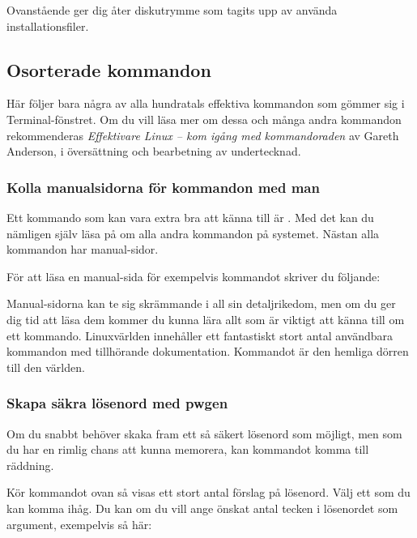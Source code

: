 \documentclass[a4paper,final]{memoir} %
\begin{document}

Ovanstående ger dig åter diskutrymme som tagits upp av använda installationsfiler.

\subsection{Osorterade kommandon}

Här följer bara några av alla hundratals effektiva kommandon som gömmer sig i Terminal-fönstret. Om du vill läsa mer om dessa och många andra kommandon rekommenderas \textit{Effektivare Linux -- kom igång med kommandoraden} av Gareth Anderson, i översättning och bearbetning av undertecknad.

\subsubsection{Kolla manualsidorna för kommandon med man} 

Ett kommando som kan vara extra bra att känna till är . Med det kan du nämligen själv läsa på om alla andra kommandon på systemet. Nästan alla kommandon har manual-sidor.

För att läsa en manual-sida för exempelvis kommandot  skriver du följande:


Manual-sidorna kan te sig skrämmande i all sin detaljrikedom, men om du ger dig tid att läsa dem kommer du kunna lära allt som är viktigt att känna till om ett kommando. Linuxvärlden innehåller ett fantastiskt stort antal användbara kommandon med tillhörande dokumentation. Kommandot  är den hemliga dörren till den världen.

\subsubsection{Skapa säkra lösenord med pwgen}\label{sec:pwgen} 

Om du snabbt behöver skaka fram ett så säkert lösenord som möjligt, men som du har en rimlig chans att kunna memorera, kan kommandot  komma till räddning. 


Kör kommandot ovan så visas ett stort antal förslag på lösenord. Välj ett som du kan komma ihåg. Du kan om du vill ange önskat antal tecken i lösenordet som argument, exempelvis så här:
\end{document}
